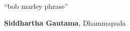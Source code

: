 %
%
\thispagestyle{empty}
\begin{epigrafe}
\begin{em}
``bob marley phrase''
\newline
\newline
\end{em}
\begin{autorepigrafe}
\textbf{Siddhartha Gautama}, Dhammapada
\end{autorepigrafe}

\end{epigrafe}


